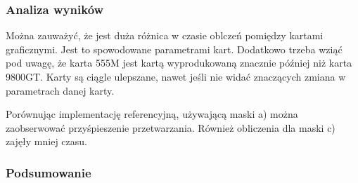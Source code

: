 \documentclass{beamer}
\begin{document}
\begin{frame}
  \frametitle{Analiza wyników}
Można zauważyć, że jest duża różnica w czasie oblczeń pomiędzy kartami graficznymi. Jest to spowodowane parametrami kart. Dodatkowo trzeba wziąć pod uwagę, że karta 555M jest kartą wyprodukowaną znacznie później niż karta 9800GT. Karty są ciągle ulepszane, nawet jeśli nie widać znaczących zmiana w parametrach danej karty.

Porównując implementację referencyjną, używającą maski a) można zaobserwować przyśpieszenie przetwarzania. Również obliczenia dla maski c) zajęły mniej czasu.
  
\end{frame}

\begin{frame}
  \frametitle{Podsumowanie}
  
\end{frame}
\end{document}
